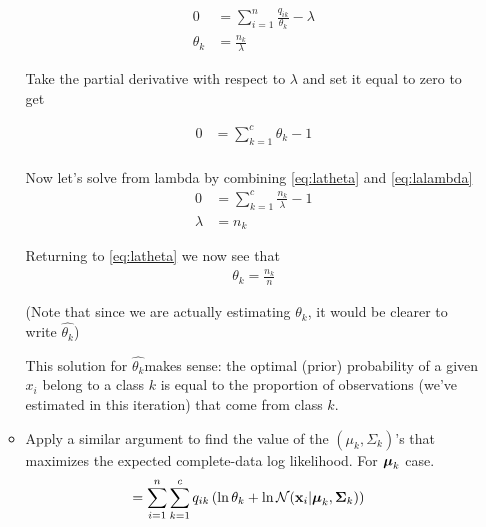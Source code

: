 \documentclass[a4paper, 12pt]{article}
\newcommand{\bx}{\mathbf{x}} %
\begin{document}
\begin{itemize}
\begin{itemize}
                    \begin{align}
                        0 &= \sum_{i=1}^n \frac{q_{ik}}{\theta_k} - \lambda \\ \label{eq:latheta}
                    \theta_k &= \frac{n_k }{\lambda}
                    \end{align}

                    Take the partial derivative with respect to $\lambda$ and set it equal to zero
                    to get

                    \begin{align}
                        0 &= \sum_{k=1}^c \theta_k - 1\\ \label{eq:lalambda}
                    \end{align}

                    Now let's solve from lambda by combining \cref{eq:latheta} and \cref{eq:lalambda}
                    \begin{align}
                        0 &= \sum_{k=1}^c \frac{n_k}{\lambda} - 1 \\
                        \lambda &= n_k
                    \end{align}

                    Returning to \cref{eq:latheta} we now see that
                    \begin{align}
                        \theta_k = \frac{n_k}{n}     
                    \end{align}

                    (Note that since we are actually estimating $\theta_k$, it would be clearer to
                    write $\hat{\theta_k}$)

                    This solution for $\hat{\theta_k} $makes sense: the optimal (prior) probability
                    of a given $x_i$ belong to a class $k$ is equal to the proportion of
                    observations (we've estimated in this iteration) that come from class $k$.



			\item Apply a similar argument to find the value of the $(\mu_k,\Sigma_k)$'s that
				maximizes the expected complete-data log likelihood. For  $\boldsymbol{\mu}_k$ case.
                \begin{align}
                        &= \sum_{i=1}^n \sum_{k=1}^c q_{ik} \left(\ln\theta_k + 
                \ln \mathcal{N}(\bx_i | \bmu_k, \bSigma_k ) \right)  \label{eq:exp}
                \end{align}


\end{itemize}
\end{itemize}
\end{document}
